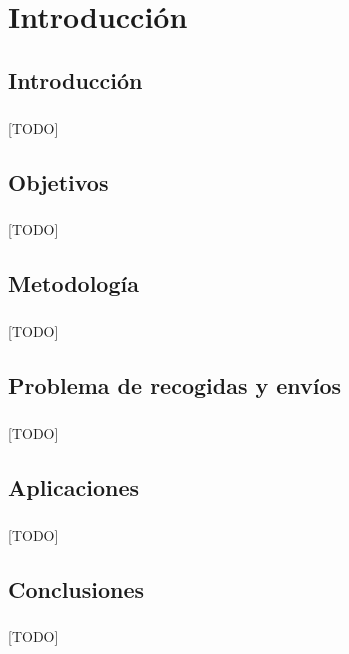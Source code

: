 \documentclass{subfiles}
\begin{document}
  \chapter{Introducción}
  \label{chap:introduction}

    \section{Introducción}
    \label{sec:introduction_introduction}

      \paragraph{}
      [TODO]

    \section{Objetivos}
    \label{sec:introduction_objectives}

      \paragraph{}
      [TODO]

    \section{Metodología}
    \label{sec:introduction_metodology}

      \paragraph{}
      [TODO]

    \section{Problema de recogidas y envíos}
    \label{sec:introduction_pickup_and_delivery}

      \paragraph{}
      [TODO]

    \section{Aplicaciones}
    \label{sec:introduction_applications}

      \paragraph{}
      [TODO]

    \section{Conclusiones}
    \label{sec:introdution_conclusions}

      \paragraph{}
      [TODO]
\end{document}
